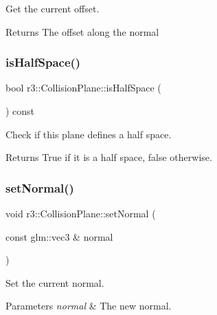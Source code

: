Get the current offset. 

\begin{DoxyReturn}{Returns}
The offset along the normal 
\end{DoxyReturn}
\mbox{\label{classr3_1_1_collision_plane_a87f5071d181b4c643b42cb2448464be2}} 
\subsubsection{\texorpdfstring{is\+Half\+Space()}{isHalfSpace()}}
{\footnotesize\ttfamily bool r3\+::\+Collision\+Plane\+::is\+Half\+Space (\begin{DoxyParamCaption}{ }\end{DoxyParamCaption}) const}



Check if this plane defines a half space. 

\begin{DoxyReturn}{Returns}
True if it is a half space, false otherwise. 
\end{DoxyReturn}
\mbox{\label{classr3_1_1_collision_plane_a1fa140b6648f14bef9720ac0d4eefc99}} 
\subsubsection{\texorpdfstring{set\+Normal()}{setNormal()}}
{\footnotesize\ttfamily void r3\+::\+Collision\+Plane\+::set\+Normal (\begin{DoxyParamCaption}\item[{const glm\+::vec3 \&}]{normal }\end{DoxyParamCaption})}



Set the current normal. 


\begin{DoxyParams}{Parameters}
{\em normal} & The new normal. \\
\hline
\end{DoxyParams}
\mbox{\label{classr3_1_1_collision_plane_ae37e09e6b807cdd800671daa5623b073}} 
